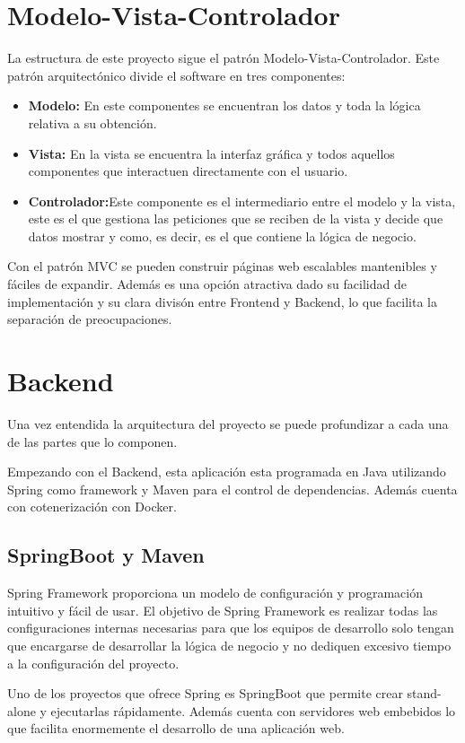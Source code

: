 \section{Modelo-Vista-Controlador}
La estructura de este proyecto sigue el patrón Modelo-Vista-Controlador\cite{mvc}. Este patrón arquitectónico divide el software en tres componentes:
\begin{itemize}
    \item \textbf{Modelo:} En este componentes se encuentran los datos y toda la lógica relativa a su obtención.
    \item \textbf{Vista:} En la vista se encuentra la interfaz gráfica y todos aquellos componentes que interactuen directamente con el usuario.
    \item \textbf{Controlador:}Este componente es el intermediario entre el modelo y la vista, este es el que gestiona las peticiones que se reciben de la vista y decide que datos mostrar y como, es decir, es el que contiene la lógica de negocio.
\end{itemize}

Con el patrón MVC se pueden construir páginas web escalables mantenibles y fáciles de expandir. Además es una opción atractiva dado su facilidad de implementación y su clara divisón entre Frontend y Backend, lo que facilita la separación de preocupaciones.

\section{Backend}
Una vez entendida la arquitectura del proyecto se puede profundizar a cada una de las partes que lo componen.

Empezando con el Backend, esta aplicación esta programada en Java utilizando Spring como framework y Maven para el control de dependencias. Además cuenta con cotenerización con Docker.

\subsection{SpringBoot y Maven}
Spring Framework proporciona un modelo de configuración y programación intuitivo y fácil de usar. El objetivo de Spring Framework\cite{spring-framework} es realizar todas las configuraciones internas necesarias para que los equipos de desarrollo solo tengan que encargarse de desarrollar la lógica de negocio y no dediquen excesivo tiempo a la configuración del proyecto.

Uno de los proyectos que ofrece Spring es SpringBoot\cite{spring-boot} que permite crear stand-alone y ejecutarlas rápidamente. Además cuenta con servidores web embebidos lo que facilita enormemente el desarrollo de una aplicación web.

